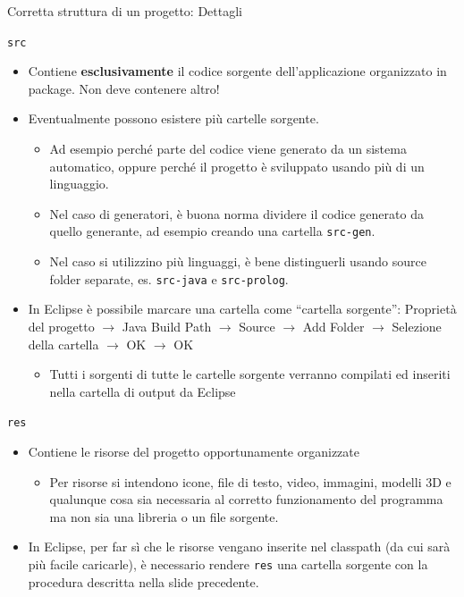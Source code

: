 \documentclass[presentation]{beamer}
\begin{document}
\begin{frame}[allowframebreaks]{Corretta struttura di un progetto: Dettagli}
	\begin{block}{\texttt{src}}
		\begin{itemize}
			\item Contiene \textbf{esclusivamente} il codice sorgente dell'applicazione organizzato in package. Non deve contenere altro!
			\item Eventualmente possono esistere più cartelle sorgente.
			\begin{itemize}
				\item Ad esempio perché parte del codice viene generato da un sistema automatico, oppure perché il progetto è sviluppato usando più di un linguaggio.
				\item Nel caso di generatori, è buona norma dividere il codice generato da quello generante, ad esempio creando una cartella \texttt{src-gen}.
				\item Nel caso si utilizzino più linguaggi, è bene distinguerli usando source folder separate, es. \texttt{src-java} e \texttt{src-prolog}.
			\end{itemize} 
			\item In Eclipse è possibile marcare una cartella come ``cartella sorgente'': Proprietà del progetto $\rightarrow$ Java Build Path $\rightarrow$ Source $\rightarrow$ Add Folder $\rightarrow$ Selezione della cartella $\rightarrow$ OK $\rightarrow$ OK
			\begin{itemize}
				\item Tutti i sorgenti di tutte le cartelle sorgente verranno compilati ed inseriti nella cartella di output da Eclipse
			\end{itemize}		
		\end{itemize}
	\end{block}
	\begin{block}{\texttt{res}}
		\begin{itemize}
			\item Contiene le risorse del progetto opportunamente organizzate
			\begin{itemize}
				\item Per risorse si intendono icone, file di testo, video, immagini, modelli 3D e qualunque cosa sia necessaria al corretto funzionamento del programma ma non sia una libreria o un file sorgente.
			\end{itemize}
			\item In Eclipse, per far sì che le risorse vengano inserite nel classpath (da cui sarà più facile caricarle), è necessario rendere \texttt{res} una cartella sorgente con la procedura descritta nella slide precedente.

\end{itemize}
\end{block}
\end{frame}
\end{document}
